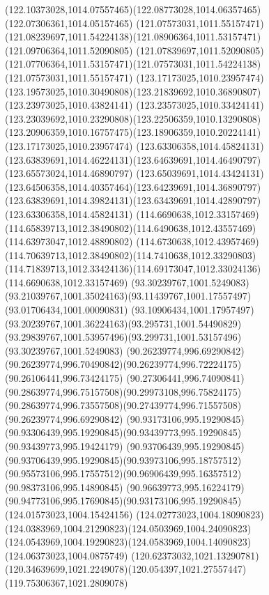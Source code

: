{{	\curveto(122.10373028,1014.07557465)(122.08773028,1014.06357465)(122.07306361,1014.05157465)
	\moveto(121.07573031,1011.55157471)
	\curveto(121.08239697,1011.54224138)(121.08906364,1011.53157471)(121.09706364,1011.52090805)
	\lineto(121.07839697,1011.52090805)
	\curveto(121.07706364,1011.53157471)(121.07573031,1011.54224138)(121.07573031,1011.55157471)
	\moveto(123.17173025,1010.23957474)
	\curveto(123.19573025,1010.30490808)(123.21839692,1010.36890807)(123.23973025,1010.43824141)
	\curveto(123.23573025,1010.33424141)(123.23039692,1010.23290808)(123.22506359,1010.13290808)
	\curveto(123.20906359,1010.16757475)(123.18906359,1010.20224141)(123.17173025,1010.23957474)
	\moveto(123.63306358,1014.45824131)
	\curveto(123.63839691,1014.46224131)(123.64639691,1014.46490797)(123.65573024,1014.46890797)
	\curveto(123.65039691,1014.43424131)(123.64506358,1014.40357464)(123.64239691,1014.36890797)
	\curveto(123.63839691,1014.39824131)(123.63439691,1014.42890797)(123.63306358,1014.45824131)
	\moveto(114.6690638,1012.33157469)
	\curveto(114.65839713,1012.38490802)(114.6490638,1012.43557469)(114.63973047,1012.48890802)
	\curveto(114.6730638,1012.43957469)(114.70639713,1012.38490802)(114.7410638,1012.33290803)
	\curveto(114.71839713,1012.33424136)(114.69173047,1012.33024136)(114.6690638,1012.33157469)
	\moveto(93.30239767,1001.5249083)
	\curveto(93.21039767,1001.35024163)(93.11439767,1001.17557497)(93.01706434,1001.00090831)
	\curveto(93.10906434,1001.17957497)(93.20239767,1001.36224163)(93.295731,1001.54490829)
	\curveto(93.29839767,1001.53957496)(93.299731,1001.53157496)(93.30239767,1001.5249083)
	\moveto(90.26239774,996.69290842)
	\curveto(90.26239774,996.70490842)(90.26239774,996.72224175)(90.26106441,996.73424175)
	\curveto(90.27306441,996.74090841)(90.28639774,996.75157508)(90.29973108,996.75824175)
	\curveto(90.28639774,996.73557508)(90.27439774,996.71557508)(90.26239774,996.69290842)
	\moveto(90.93173106,995.19290845)
	\curveto(90.93306439,995.19290845)(90.93439773,995.19290845)(90.93439773,995.19424179)
	\curveto(90.93706439,995.19290845)(90.93706439,995.19290845)(90.93973106,995.18757512)
	\curveto(90.95573106,995.17557512)(90.96906439,995.16357512)(90.98373106,995.14890845)
	\curveto(90.96639773,995.16224179)(90.94773106,995.17690845)(90.93173106,995.19290845)
	\moveto(124.01573023,1004.15424156)
	\curveto(124.02773023,1004.18090823)(124.0383969,1004.21290823)(124.0503969,1004.24090823)
	\curveto(124.0543969,1004.19290823)(124.0583969,1004.14090823)(124.06373023,1004.0875749)
	\closepath
	\moveto(120.62373032,1021.13290781)
	\curveto(120.34639699,1021.2249078)(120.054397,1021.27557447)(119.75306367,1021.2809078)
}}
